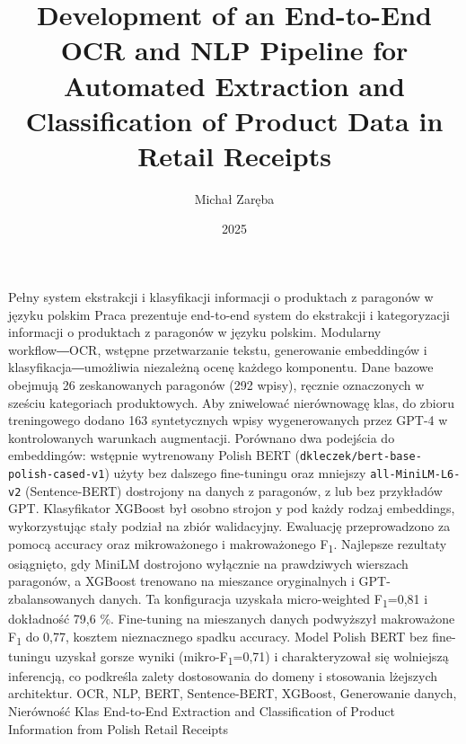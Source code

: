 \documentclass{SGGW-thesis-EN}
\title{Development of an End-to-End OCR and NLP Pipeline for Automated Extraction and Classification of Product Data in Retail Receipts}
\author{Michał Zaręba}
\date{2025}
\begin{document}
\maketitle
\statementpage
\abstractpage
{Pełny system ekstrakcji i klasyfikacji informacji o produktach z paragonów w języku polskim}
{Praca prezentuje end-to-end system do ekstrakcji i kategoryzacji informacji o produktach z paragonów w języku polskim. 
Modularny workflow―OCR, wstępne przetwarzanie tekstu, generowanie embeddingów i klasyfikacja―umożliwia niezależną ocenę każdego komponentu. 
Dane bazowe obejmują 26 zeskanowanych paragonów (292 wpisy), ręcznie oznaczonych w sześciu kategoriach produktowych. 
Aby zniwelować nierównowagę klas, do zbioru treningowego dodano 163 syntetycznych wpisy wygenerowanych przez GPT-4 w kontrolowanych warunkach augmentacji.
Porównano dwa podejścia do embeddingów: wstępnie wytrenowany Polish BERT (\texttt{dkleczek/bert-base-polish-cased-v1}) użyty bez dalszego fine-tuningu 
oraz mniejszy \texttt{all-MiniLM-L6-v2} (Sentence-BERT) dostrojony na danych z paragonów, z lub bez przykładów GPT.
Klasyfikator XGBoost był osobno strojon y pod każdy rodzaj embeddings, wykorzystując stały podział na zbiór walidacyjny. 
Ewaluację przeprowadzono za pomocą accuracy oraz mikroważonego i makroważonego F\textsubscript{1}.
Najlepsze rezultaty osiągnięto, gdy MiniLM dostrojono wyłącznie na prawdziwych wierszach paragonów, 
a XGBoost trenowano na mieszance oryginalnych i GPT-zbalansowanych danych. Ta konfiguracja uzyskała micro-weighted F\textsubscript{1}=0,81 i dokładność 79,6 \%. 
Fine-tuning na mieszanych danych podwyższył makroważone F\textsubscript{1} do 0,77, kosztem nieznacznego spadku accuracy.
Model Polish BERT bez fine-tuningu uzyskał gorsze wyniki (mikro-F\textsubscript{1}=0,71) i charakteryzował się wolniejszą inferencją, 
co podkreśla zalety dostosowania do domeny i stosowania lżejszych architektur.}
{OCR, NLP, BERT, Sentence-BERT, XGBoost, Generowanie danych, Nierówność Klas}
{End-to-End Extraction and Classification of Product Information from Polish Retail Receipts}
\end{document}
